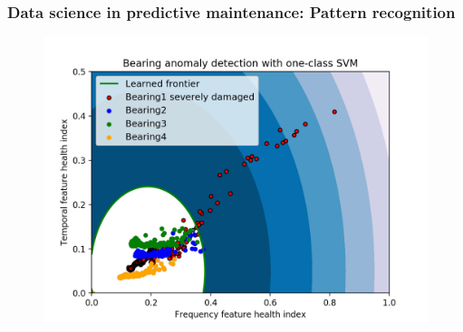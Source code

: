 \documentclass{beamer}
\begin{document}
\begin{frame}
	\frametitle{Data science in predictive maintenance: Pattern recognition}
	\begin{figure}[H]
		\centering
		\includegraphics[width=0.5\linewidth]{svm}
	\end{figure}
\end{frame}

\end{document}
